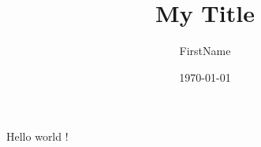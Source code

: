 \documentclass[a4paper, 12pt]{article}
\title{My Title}
\author{FirstName \bsc{LastName}}
\date{\today}
\begin{document}
\maketitle

Hello world !
\end{document}
